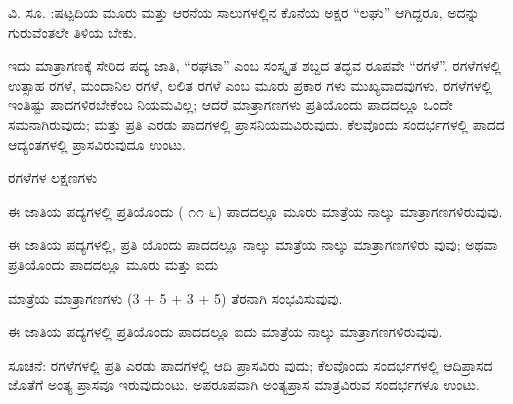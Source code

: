 \indent ವಿ. ಸೂ. :ಷಟ್ಪದಿಯ ಮೂರು ಮತ್ತು ಆರನೆಯ ಸಾಲುಗಳಲ್ಲಿನ ಕೊನೆಯ ಅಕ್ಷರ “ಲಘು” ಆಗಿದ್ದರೂ, ಅದನ್ನು ಗುರುವೆಂತಲೇ ತಿಳಿಯ ಬೇಕು.\par

\vspace{4pt plus 4pt minus 1pt}\hspace{0.5em}ಇದು ಮಾತ್ರಾಗಣಕ್ಕೆ ಸೇರಿದ ಪದ್ಯ ಜಾತಿ, “ರಘಟಾ” ಎಂಬ ಸಂಸ್ಕೃತ ಶಬ್ದದ ತದ್ಭವ ರೂಪವೇ “ರಗಳೆ”. ರಗಳೆಗಳಲ್ಲಿ ಉತ್ಸಾಹ ರಗಳೆ, ಮಂದಾನಿಲ ರಗಳೆ, ಲಲಿತ ರಗಳೆ ಎಂಬ ಮೂರು ಪ್ರಕಾರ ಗಳು ಮುಖ್ಯವಾದವುಗಳು. ರಗಳೆಗಳಲ್ಲಿ ಇಂತಿಷ್ಟು ಪಾದಗಳಿರಬೇಕೆಂಬ ನಿಯಮವಿಲ್ಲ; ಆದರೆ ಮಾತ್ರಾಗಣಗಳು ಪ್ರತಿಯೊಂದು ಪಾದದಲ್ಲೂ ಒಂದೇ ಸಮನಾಗಿರುವುದು; ಮತ್ತು ಪ್ರತಿ ಎರಡು ಪಾದಗಳಲ್ಲಿ ಪ್ರಾಸನಿಯಮವಿರುವುದು. ಕೆಲವೊಂದು ಸಂದರ್ಭಗಳಲ್ಲಿ ಪಾದದ ಆದ್ಯಂತಗಳಲ್ಲಿ ಪ್ರಾಸವಿರುವುದೂ ಉಂಟು.\par

\indent ರಗಳೆಗಳ ಲಕ್ಷಣಗಳು\par

\vspace{4pt plus 4pt minus 1pt}\hspace{0.5em}ಈ ಜಾತಿಯ ಪದ್ಯಗಳಲ್ಲಿ ಪ್ರತಿಯೊಂದು ( ೧೧ ೬) ಪಾದದಲ್ಲೂ ಮೂರು ಮಾತ್ರೆಯ ನಾಲ್ಕು ಮಾತ್ರಾಗಣಗಳಿರುವುವು.\par

\vspace{4pt plus 4pt minus 1pt}\hspace{0.5em}ಈ ಜಾತಿಯ ಪದ್ಯಗಳಲ್ಲಿ, ಪ್ರತಿ ಯೊಂದು ಪಾದದಲ್ಲೂ ನಾಲ್ಕು ಮಾತ್ರೆಯ ನಾಲ್ಕು ಮಾತ್ರಾಗಣಗಳಿರು ವುವು; ಅಥವಾ ಪ್ರತಿಯೊಂದು ಪಾದದಲ್ಲೂ ಮೂರು ಮತ್ತು ಐದು\par

\indent ಮಾತ್ರೆಯ ಮಾತ್ರಾಗಣಗಳು (3 + 5 + 3 + 5) ತೆರನಾಗಿ ಸಂಭವಿಸುವುವು.\par

\vspace{4pt plus 4pt minus 1pt}\hspace{0.5em}ಈ ಜಾತಿಯ ಪದ್ಯಗಳಲ್ಲಿ ಪ್ರತಿಯೊಂದು ಪಾದದಲ್ಲೂ ಐದು ಮಾತ್ರೆಯ ನಾಲ್ಕು ಮಾತ್ರಾಗಣಗಳಿರುವುವು.\par

\indent ಸೂಚನೆ: ರಗಳೆಗಳಲ್ಲಿ ಪ್ರತಿ ಎರಡು ಪಾದಗಳಲ್ಲಿ ಆದಿ ಪ್ರಾಸವಿರು ವುದು; ಕೆಲವೊಂದು ಸಂದರ್ಭಗಳಲ್ಲಿ ಆದಿಪ್ರಾಸದ ಜೊತೆಗೆ ಅಂತ್ಯ ಪ್ರಾಸವೂ ಇರುವುದುಂಟು. ಅಪರೂಪವಾಗಿ ಅಂತ್ಯಪ್ರಾಸ ಮಾತ್ರವಿರುವ ಸಂದರ್ಭಗಳೂ ಉಂಟು.\par
